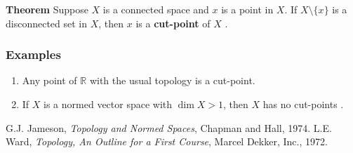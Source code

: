 \documentclass[12pt]{article}
\newcommand{\sR}[0]{\mathbb{R}}
\begin{document}
{\bf Theorem}
Suppose $X$ is a connected space and $x$ is a point in $X$.
If $X\setminus \{x\}$ is a disconnected set in $X$, then $x$ is a
{\bf cut-point} of $X$ \cite{jameson, ward}.

\subsubsection{Examples}
\begin{enumerate}
\item Any point of $\sR$ with the usual topology is a cut-point.
\item If $X$ is a normed vector space with $\dim X>1$, then $X$ has
no cut-points \cite{jameson}.
\end{enumerate}

\begin{thebibliography}{9}
  G.J. Jameson, \emph{Topology and Normed Spaces},
 Chapman and Hall, 1974.
 L.E. Ward, \emph{Topology, An Outline for a First Course},
Marcel Dekker, Inc., 1972.
 \end{thebibliography}
\end{document}
